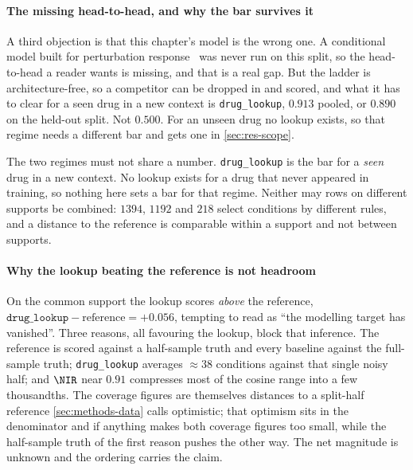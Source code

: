 \paragraph{The missing head-to-head, and why the bar survives it} A third
objection is that this chapter's model is the wrong one. A conditional model
built for perturbation response~\cite{cpa,scgen,gears} was never run on this
split, so the head-to-head a reader wants is missing, and that is a real gap. But
the ladder is architecture-free, so a competitor can be dropped in and scored,
and what it has to clear for a seen drug in a new context is
\texttt{drug\_lookup}, $0.913$ pooled, or $0.890$ on the held-out split. Not
$0.500$. For an unseen drug no lookup exists, so that regime needs a different
bar and gets one in \cref{sec:res-scope}.

\begin{scopelimit}
The two regimes must not share a number. \texttt{drug\_lookup} is the bar for a
\emph{seen} drug in a new context. No lookup exists for a drug that never
appeared in training, so nothing here sets a bar for that regime. Neither may
rows on different supports be combined: $\num{1394}$, $\num{1192}$ and
$\num{218}$ select conditions by different rules, and a distance to the reference
is comparable within a support and not between supports.
\end{scopelimit}

\paragraph{Why the lookup beating the reference is not headroom} On the common
support the lookup scores \emph{above} the reference,
$\texttt{drug\_lookup} - \textrm{reference} = +0.056$, tempting to read as ``the
modelling target has vanished''. Three reasons, all favouring the lookup, block
that inference. The reference is scored against a half-sample truth and every
baseline against the full-sample truth; \texttt{drug\_lookup} averages
$\approx 38$ conditions against that single noisy half; and $\NIR$ near $0.91$
compresses most of the cosine range into a few thousandths. The coverage figures
are themselves distances to a split-half reference \cref{sec:methods-data} calls
optimistic; that optimism sits in the denominator and if anything makes both
coverage figures too small, while the half-sample truth of the first reason
pushes the other way. The net magnitude is unknown and the ordering carries the
claim.

